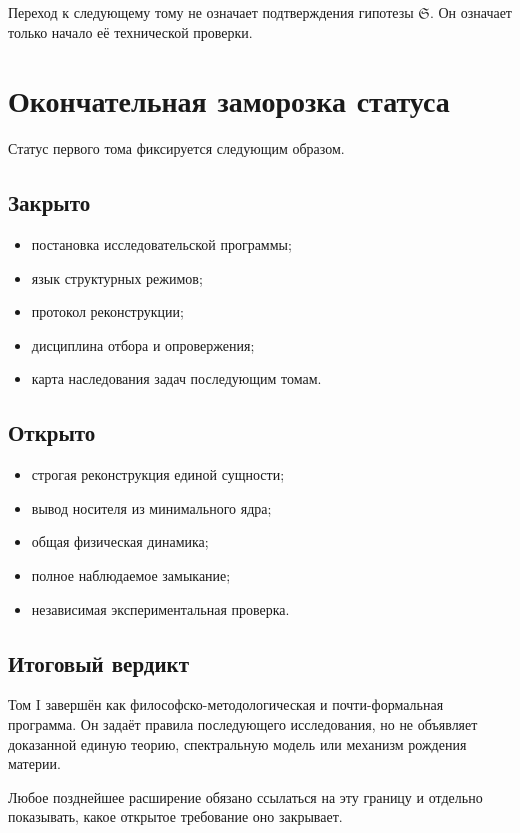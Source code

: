 Переход к следующему тому не означает подтверждения гипотезы $\mathfrak S$.
Он означает только начало её технической проверки.

\chapter{Окончательная заморозка статуса}

Статус первого тома фиксируется следующим образом.

\section{Закрыто}

\begin{itemize}
 \item постановка исследовательской программы;
 \item язык структурных режимов;
 \item протокол реконструкции;
 \item дисциплина отбора и опровержения;
 \item карта наследования задач последующим томам.
\end{itemize}

\section{Открыто}

\begin{itemize}
 \item строгая реконструкция единой сущности;
 \item вывод носителя из минимального ядра;
 \item общая физическая динамика;
 \item полное наблюдаемое замыкание;
 \item независимая экспериментальная проверка.
\end{itemize}

\section{Итоговый вердикт}

Том I завершён как философско-методологическая и почти-формальная программа.
Он задаёт правила последующего исследования, но не объявляет доказанной
единую теорию, спектральную модель или механизм рождения материи.

Любое позднейшее расширение обязано ссылаться на эту границу и отдельно
показывать, какое открытое требование оно закрывает.